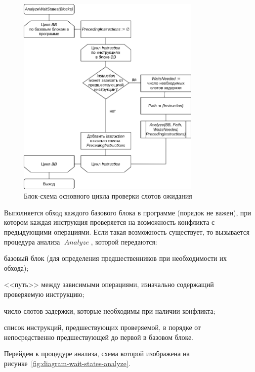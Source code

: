 \documentclass[a4paper,14pt]{extarticle}
\newcommand{\var}[1]{\mathop{\mathit{#1}}}
\begin{document}
{\begin{figure}[H]
\centering
\includegraphics[width=0.8\textwidth]{diagrams/alg-wait-states}
\caption{Блок-схема основного цикла проверки слотов ожидания}
\label{fig:diagram-wait-states}
\end{figure}

Выполняется обход каждого базового блока в программе (порядок не важен),
при котором каждая инструкция проверяется на возможность конфликта
с предыдующими операциями. Если такая возможность существует,
то вызывается процедура анализа $\var{Analyze}$, которой передаются:
\begin{ul}
\item базовый блок (для определения предшественников при необходимости их обхода);
\item <<путь>> между зависимыми операциями, изначально содержащий проверяемую инструкцию;
\item число слотов задержки, которые необходимы при наличии конфликта;
\item список инструкций, предшествующих проверяемой, в порядке
от непосредственно предшествующей до первой в базовом блоке.
\end{ul}

Перейдем к процедуре анализа, схема которой изображена
на рисунке~\ref{fig:diagram-wait-states-analyze}.

}
\end{document}
